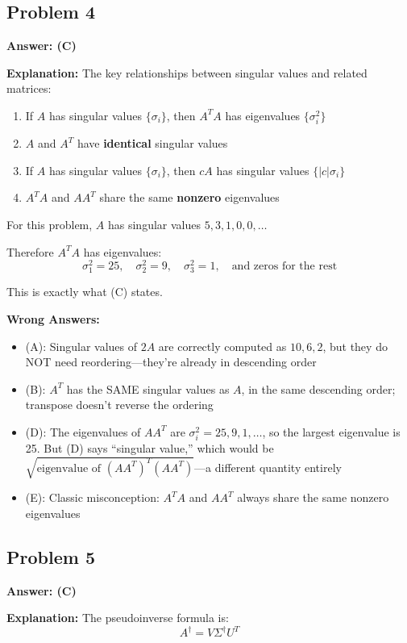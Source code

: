 \documentclass[12pt]{amsart}
\newcommand{\correct}[1]{{\color{correctgreen}\textbf{#1}}}
\begin{document}
\begin{itemize}
\subsection*{Problem 4}
\correct{Answer: (C)}

\textbf{Explanation:} The key relationships between singular values and related matrices:
\begin{enumerate}
\item If $A$ has singular values $\{\sigma_i\}$, then $A^TA$ has eigenvalues $\{\sigma_i^2\}$
\item $A$ and $A^T$ have \textbf{identical} singular values
\item If $A$ has singular values $\{\sigma_i\}$, then $cA$ has singular values $\{|c|\sigma_i\}$
\item $A^TA$ and $AA^T$ share the same \textbf{nonzero} eigenvalues
\end{enumerate}

For this problem, $A$ has singular values $5, 3, 1, 0, 0, \ldots$

Therefore $A^TA$ has eigenvalues:
$$\sigma_1^2 = 25, \quad \sigma_2^2 = 9, \quad \sigma_3^2 = 1, \quad \text{and zeros for the rest}$$

This is exactly what (C) states.

\textbf{Wrong Answers:}
\begin{itemize}
\item (A): Singular values of $2A$ are correctly computed as $10, 6, 2$, but they do NOT need reordering---they're already in descending order
\item (B): $A^T$ has the SAME singular values as $A$, in the same descending order; transpose doesn't reverse the ordering
\item (D): The eigenvalues of $AA^T$ are $\sigma_i^2 = 25, 9, 1, \ldots$, so the largest eigenvalue is 25. But (D) says ``singular value,'' which would be $\sqrt{\text{eigenvalue of }(AA^T)^T(AA^T)}$---a different quantity entirely
\item (E): Classic misconception: $A^TA$ and $AA^T$ always share the same nonzero eigenvalues
\end{itemize}

\subsection*{Problem 5}
\correct{Answer: (C)}

\textbf{Explanation:} The pseudoinverse formula is:
$$A^\dagger = V\Sigma^\dagger U^T$$


\end{itemize}
\end{document}
